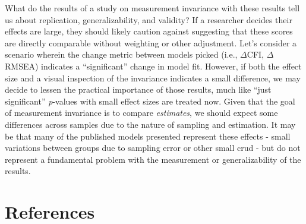 \documentclass[
  man]{apa7}
\begin{document}
What do the results of a study on measurement invariance with these results tell us about replication, generalizability, and validity? If a researcher decides their effects are large, they should likely caution against suggesting that these scores are directly comparable without weighting or other adjustment. Let's consider a scenario wherein the change metric between models picked (i.e., \(\Delta\)CFI, \(\Delta\)RMSEA) indicates a ``significant'' change in model fit. However, if both the effect size and a visual inspection of the invariance indicates a small difference, we may decide to lessen the practical importance of those results, much like ``just significant'' \emph{p}-values with small effect sizes are treated now. Given that the goal of measurement invariance is to compare \emph{estimates}, we should expect some differences across samples due to the nature of sampling and estimation. It may be that many of the published models presented represent these effects - small variations between groups due to sampling error or other small crud - but do not represent a fundamental problem with the measurement or generalizability of the results.

\newpage

\hypertarget{references}{%
\section{References}\label{references}}
\end{document}
